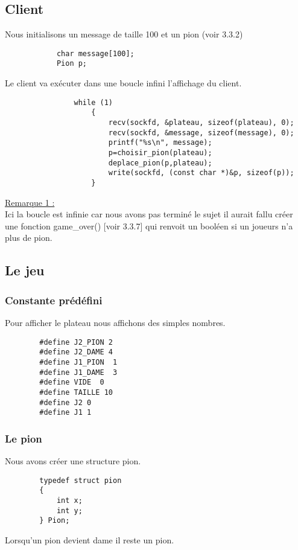 \documentclass{article}
\begin{document}
    \subsection{Client}
        Nous initialisons un message de taille 100 et un pion (voir 3.3.2)
        \begin{lstlisting}
            char message[100];
            Pion p;
        \end{lstlisting}
        \newpage
            Le client va exécuter dans une boucle infini l'affichage du client.
            \begin{lstlisting}
                while (1)
                    {
                        recv(sockfd, &plateau, sizeof(plateau), 0);
                        recv(sockfd, &message, sizeof(message), 0);
                        printf("%s\n", message);
                        p=choisir_pion(plateau);
                        deplace_pion(p,plateau);
                        write(sockfd, (const char *)&p, sizeof(p));
                    }
            \end{lstlisting}
            \underline{Remarque 1 : }  \\ Ici la boucle est infinie car nous avons pas terminé 
            le sujet il aurait fallu créer une fonction game\_over() [voir 3.3.7] qui renvoit un booléen 
            si un joueurs n'a plus de pion.
    \subsection{Le jeu}
    \subsubsection{Constante prédéfini}
    Pour afficher le plateau nous affichons des simples nombres.
    \begin{lstlisting}
        #define J2_PION 2
        #define J2_DAME 4
        #define J1_PION  1
        #define J1_DAME  3
        #define VIDE  0
        #define TAILLE 10
        #define J2 0
        #define J1 1
    \end{lstlisting}
    \subsubsection{Le pion}
    Nous avons créer une structure pion.
    \begin{lstlisting}
        typedef struct pion
        {
            int x;
            int y;
        } Pion;
    \end{lstlisting}
    Lorsqu'un pion devient dame il reste un pion. 
    \newpage
\end{document}
